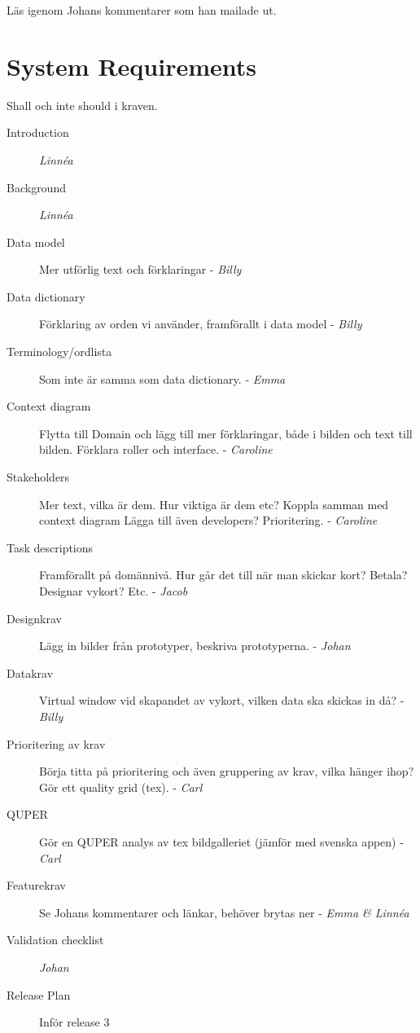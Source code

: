 \documentclass[10pt,a4paper]{article}
\author{Linnéa Claesson}
\begin{document}
Läs igenom Johans kommentarer som han mailade ut.

\section*{System Requirements}
Shall och inte should i kraven. 

\begin{description}
\item[Introduction] \textit{Linnéa}

\item[Background] \textit{Linnéa}

\item[Data model] Mer utförlig text och förklaringar - \textit{Billy}

\item[Data dictionary] Förklaring av orden vi använder, framförallt i data model - \textit{Billy}

\item[Terminology/ordlista] Som inte är samma som data dictionary. - \textit{Emma}

\item[Context diagram] Flytta till Domain och lägg till mer förklaringar, både i bilden och text till bilden. Förklara roller och interface. - \textit{Caroline}

\item[Stakeholders] Mer text, vilka är dem. Hur viktiga är dem etc? Koppla samman med context diagram Lägga till även developers? Prioritering. - \textit{Caroline}

\item[Task descriptions] Framförallt på domännivå. Hur går det till när man skickar kort? Betala? Designar vykort? Etc. - \textit{Jacob}

\item[Designkrav] Lägg in bilder från prototyper, beskriva prototyperna. - \textit{Johan}

\item[Datakrav] Virtual window vid skapandet av vykort, vilken data ska skickas in då? - \textit{Billy} 

\item[Prioritering av krav] Börja titta på prioritering och även gruppering av krav, vilka hänger ihop? Gör ett quality grid (tex).  - \textit{Carl} 

\item[QUPER] Gör en QUPER analys av tex bildgalleriet (jämför med svenska appen) - \textit{Carl}

\item[Featurekrav] Se Johans kommentarer och länkar, behöver brytas ner - \textit{Emma \& Linnéa} 

\item[Validation checklist] \textit{Johan}

\item[Release Plan] Inför release 3

\end{description}
\end{document}
